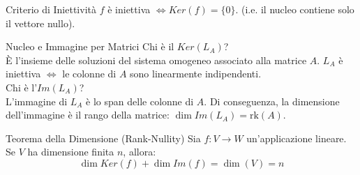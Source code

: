 \begin{proposition}{Criterio di Iniettività}{}
$f$ è iniettiva $\iff Ker(f) = \{ 0 \}$. (i.e. il nucleo contiene solo il vettore nullo).
\end{proposition}

\begin{concept}{Nucleo e Immagine per Matrici}
Chi è il $Ker(L_A)$?\\
È l'insieme delle soluzioni del sistema omogeneo associato alla matrice $A$. $L_A$ è iniettiva $\iff$ le colonne di $A$ sono linearmente indipendenti.\\
Chi è l'$Im(L_A)$?\\
L'immagine di $L_A$ è lo span delle colonne di $A$. Di conseguenza, la dimensione dell'immagine è il rango della matrice: $\dim Im(L_A) = \text{rk}(A)$.
\end{concept}

\begin{proposition}{Teorema della Dimensione (Rank-Nullity)}{}
Sia $f: V \to W$ un'applicazione lineare. Se $V$ ha dimensione finita $n$, allora:
$$ \dim Ker(f) + \dim Im(f) = \dim(V) = n $$
\end{proposition}

